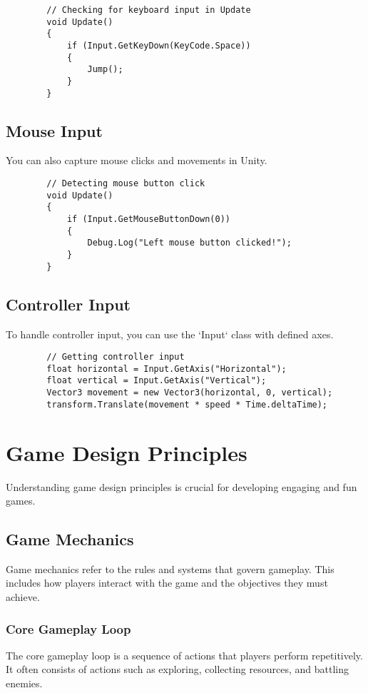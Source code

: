 \documentclass[a4paper,12pt]{book}
\begin{document}
	\begin{lstlisting}
		// Checking for keyboard input in Update
		void Update()
		{
			if (Input.GetKeyDown(KeyCode.Space))
			{
				Jump();
			}
		}
	\end{lstlisting}
	
	\section{Mouse Input}
	You can also capture mouse clicks and movements in Unity.
	
	\begin{lstlisting}
		// Detecting mouse button click
		void Update()
		{
			if (Input.GetMouseButtonDown(0))
			{
				Debug.Log("Left mouse button clicked!");
			}
		}
	\end{lstlisting}
	
	\section{Controller Input}
	To handle controller input, you can use the `Input` class with defined axes.
	
	\begin{lstlisting}
		// Getting controller input
		float horizontal = Input.GetAxis("Horizontal");
		float vertical = Input.GetAxis("Vertical");
		Vector3 movement = new Vector3(horizontal, 0, vertical);
		transform.Translate(movement * speed * Time.deltaTime);
	\end{lstlisting}
	
	\chapter{Game Design Principles}
	Understanding game design principles is crucial for developing engaging and fun games.
	
	\section{Game Mechanics}
	Game mechanics refer to the rules and systems that govern gameplay. This includes how players interact with the game and the objectives they must achieve.
	
	\subsection{Core Gameplay Loop}
	The core gameplay loop is a sequence of actions that players perform repetitively. It often consists of actions such as exploring, collecting resources, and battling enemies.
	
\end{document}
